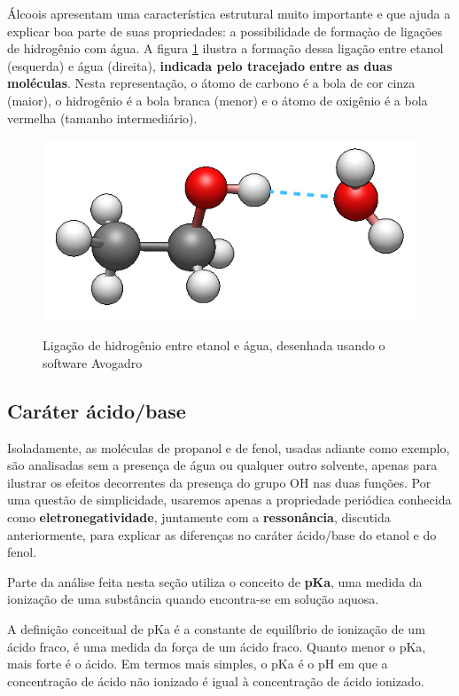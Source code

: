 Álcoois apresentam uma característica estrutural muito importante e que ajuda a explicar boa parte de suas propriedades: a possibilidade de formaçào de ligações de hidrogênio com água. A figura \ref{fig:ligacaoh}  ilustra a formação dessa ligação entre etanol (esquerda) e água (direita), \textbf{indicada pelo tracejado entre as duas moléculas}. Nesta representação, o átomo de carbono é a bola de cor cinza (maior), o hidrogênio é a bola branca (menor) e o átomo de oxigênio é a bola vermelha (tamanho intermediário).

 \begin{figure}[h]
	\centering
	\caption{Ligação de hidrogênio entre etanol e água, desenhada usando o software Avogadro \cite{avogadro}}
	\vspace{0.5cm}
	\includegraphics[width=0.65\linewidth]{imagens/ligacaoh.png}
	\label{fig:ligacaoh}
\end{figure}

\subsection{Caráter ácido/base}

Isoladamente, as moléculas de propanol e de fenol, usadas adiante como exemplo, são analisadas sem a presença de água ou qualquer outro solvente, apenas para ilustrar os efeitos decorrentes da presença do grupo OH nas duas funções. Por uma questão de simplicidade, usaremos apenas a propriedade periódica conhecida como \textbf{eletronegatividade}, juntamente com a \textbf{ressonância}, discutida anteriormente, para explicar as diferenças no caráter ácido/base do etanol e do fenol.

Parte da análise feita nesta seção utiliza o conceito de \textbf{pKa}, uma medida da ionização de uma substância quando encontra-se em solução aquosa.

A definição conceitual de pKa é a constante de equilíbrio de ionização de um ácido fraco, é uma medida da força de um ácido fraco. Quanto menor o pKa, mais forte é o ácido. Em termos mais simples, o pKa é o pH em que a concentração de ácido não ionizado é igual à concentração de ácido ionizado.

